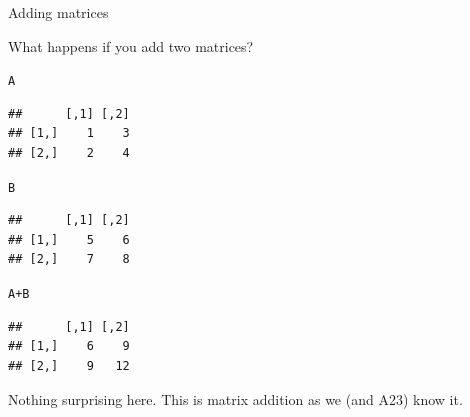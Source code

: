 \documentclass[unknownkeysallowed]{beamer}\usepackage[]{graphicx}\usepackage[]{color}
\makeatletter
\newcommand{\hlopt}[1]{\textcolor[rgb]{0,0,0}{#1}}%
\newcommand{\hlstd}[1]{\textcolor[rgb]{0.345,0.345,0.345}{#1}}%
\newenvironment{kframe}{%
 \def\at@end@of@kframe{}%
 \ifinner\ifhmode%
  \def\at@end@of@kframe{\end{minipage}}%
  \begin{minipage}{\columnwidth}%
 \fi\fi%
 \def\FrameCommand##1{\hskip\@totalleftmargin \hskip-\fboxsep
 \colorbox{shadecolor}{##1}\hskip-\fboxsep
     \hskip-\linewidth \hskip-\@totalleftmargin \hskip\columnwidth}%
 \MakeFramed {\advance\hsize-\width
   \@totalleftmargin\z@ \linewidth\hsize
   \@setminipage}}%
 {\par\unskip\endMakeFramed%
 \at@end@of@kframe}
\newenvironment{knitrout}{}{} %
\makeatother
\begin{document}
\begin{frame}[fragile]{Adding matrices}

What happens if you add two matrices?

\begin{multicols}{2}
\begin{knitrout}
\color{fgcolor}\begin{kframe}
\begin{alltt}
\hlstd{A}
\end{alltt}
\begin{verbatim}
##      [,1] [,2]
## [1,]    1    3
## [2,]    2    4
\end{verbatim}
\begin{alltt}
\hlstd{B}
\end{alltt}
\begin{verbatim}
##      [,1] [,2]
## [1,]    5    6
## [2,]    7    8
\end{verbatim}
\end{kframe}
\end{knitrout}

\begin{knitrout}
\color{fgcolor}\begin{kframe}
\begin{alltt}
\hlstd{A}\hlopt{+}\hlstd{B}
\end{alltt}
\begin{verbatim}
##      [,1] [,2]
## [1,]    6    9
## [2,]    9   12
\end{verbatim}
\end{kframe}
\end{knitrout}
\end{multicols}


Nothing surprising here. This is matrix addition as we (and A23) know it.

  
\end{frame}
\end{document}
